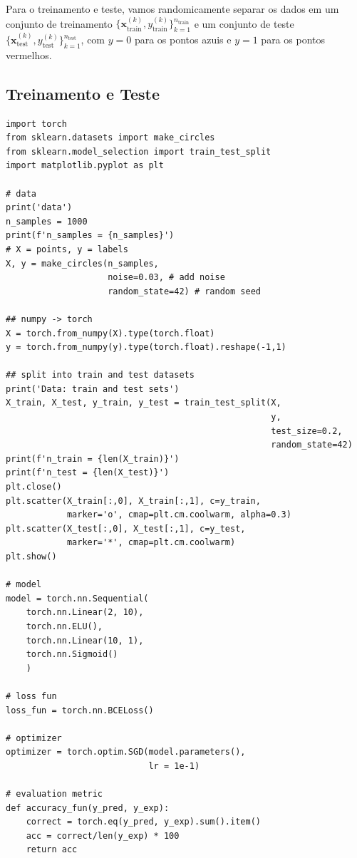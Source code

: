 Para o treinamento e teste, vamos randomicamente separar os dados em um conjunto de treinamento $\{\pmb{x}_{\text{train}}^{(k)}, y_{\text{train}}^{(k)}\}_{k=1}^{n_{\text{train}}}$ e um conjunto de teste $\{\pmb{x}_{\text{test}}^{(k)}, y_{\text{test}}^{(k)}\}_{k=1}^{n_{\text{test}}}$, com $y=0$ para os pontos azuis e $y=1$ para os pontos vermelhos.

\subsection{Treinamento e Teste}

\begin{lstlisting}[caption=mlp\_classbin.py, label=cap_mlp_sec_classbin:cod:classbin]
import torch
from sklearn.datasets import make_circles
from sklearn.model_selection import train_test_split
import matplotlib.pyplot as plt

# data
print('data')
n_samples = 1000
print(f'n_samples = {n_samples}')
# X = points, y = labels
X, y = make_circles(n_samples,
                    noise=0.03, # add noise
                    random_state=42) # random seed

## numpy -> torch
X = torch.from_numpy(X).type(torch.float)
y = torch.from_numpy(y).type(torch.float).reshape(-1,1)

## split into train and test datasets
print('Data: train and test sets')
X_train, X_test, y_train, y_test = train_test_split(X,
                                                    y,
                                                    test_size=0.2,
                                                    random_state=42)
print(f'n_train = {len(X_train)}')
print(f'n_test = {len(X_test)}')
plt.close()
plt.scatter(X_train[:,0], X_train[:,1], c=y_train,
            marker='o', cmap=plt.cm.coolwarm, alpha=0.3)
plt.scatter(X_test[:,0], X_test[:,1], c=y_test,
            marker='*', cmap=plt.cm.coolwarm)
plt.show()

# model
model = torch.nn.Sequential(
    torch.nn.Linear(2, 10),
    torch.nn.ELU(),
    torch.nn.Linear(10, 1),
    torch.nn.Sigmoid()
    )

# loss fun
loss_fun = torch.nn.BCELoss()

# optimizer
optimizer = torch.optim.SGD(model.parameters(),
                            lr = 1e-1)

# evaluation metric
def accuracy_fun(y_pred, y_exp):
    correct = torch.eq(y_pred, y_exp).sum().item()
    acc = correct/len(y_exp) * 100
    return acc


\end{lstlisting}
